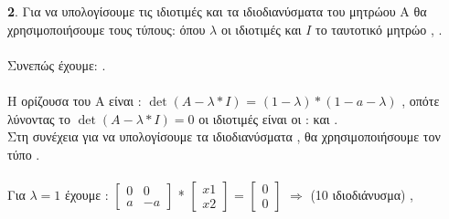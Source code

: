 \documentclass[11pt]{report}
\begin{document}
	\textbf{2}. Για να υπολογίσουμε τις ιδιοτιμές και τα ιδιοδιανύσματα του μητρώου Α θα χρησιμοποιήσουμε τους τύπους:   όπου $\lambda$ οι ιδιοτιμές και $I$ το ταυτοτικό μητρώο ,  . \\ \\
	Συνεπώς έχουμε: . \\ \\
	Η ορίζουσα του Α είναι : $\det(A - \lambda*I)$ = $(1 - \lambda)*(1- a - \lambda)$ , οπότε λύνοντας το $\det(A - \lambda*I) = 0$ οι ιδιοτιμές είναι οι :  και . \\
	Στη συνέχεια για να υπολογίσουμε τα ιδιοδιανύσματα , θα χρησιμοποιήσουμε τον τύπο  . \\ \\
	
	Για $\lambda = 1$ έχουμε : $\begin{bmatrix} 0 & 0 \\ a & -a \end{bmatrix}$ * $\begin{bmatrix} x1 \\ x2 \end{bmatrix}$ = $\begin{bmatrix} 0 \\ 0 \end{bmatrix}$ $\Rightarrow$    (1{\scriptsize 0} ιδιοδιάνυσμα) , \\ \\
	
\end{document}
